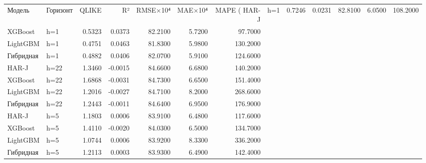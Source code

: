 \begin{tabular}{llrrrrr}
\toprule
Модель & Горизонт & QLIKE & R² & RMSE×10⁴ & MAE×10⁴ & MAPE (%
\midrule
HAR-J & h=1 & 0.7246 & 0.0231 & 82.8100 & 6.0500 & 108.2000 \\
XGBoost & h=1 & 0.5323 & 0.0373 & 82.2100 & 5.7200 & 97.7000 \\
LightGBM & h=1 & 0.4751 & 0.0463 & 81.8300 & 5.9800 & 130.2000 \\
Гибридная & h=1 & 0.4882 & 0.0406 & 82.0700 & 5.9100 & 124.6000 \\
HAR-J & h=22 & 1.3460 & -0.0015 & 84.6600 & 6.6800 & 140.2000 \\
XGBoost & h=22 & 1.6868 & -0.0031 & 84.7300 & 6.6500 & 151.4000 \\
LightGBM & h=22 & 1.2016 & -0.0027 & 84.7100 & 8.2000 & 268.6000 \\
Гибридная & h=22 & 1.2443 & -0.0011 & 84.6400 & 6.9500 & 176.9000 \\
HAR-J & h=5 & 1.1803 & 0.0006 & 83.9100 & 6.4800 & 117.6000 \\
XGBoost & h=5 & 1.4110 & -0.0020 & 84.0300 & 6.5000 & 134.7000 \\
LightGBM & h=5 & 1.0744 & 0.0006 & 83.9200 & 8.3300 & 336.2000 \\
Гибридная & h=5 & 1.2113 & 0.0003 & 83.9300 & 6.4900 & 142.4000 \\
\bottomrule
\end{tabular}
